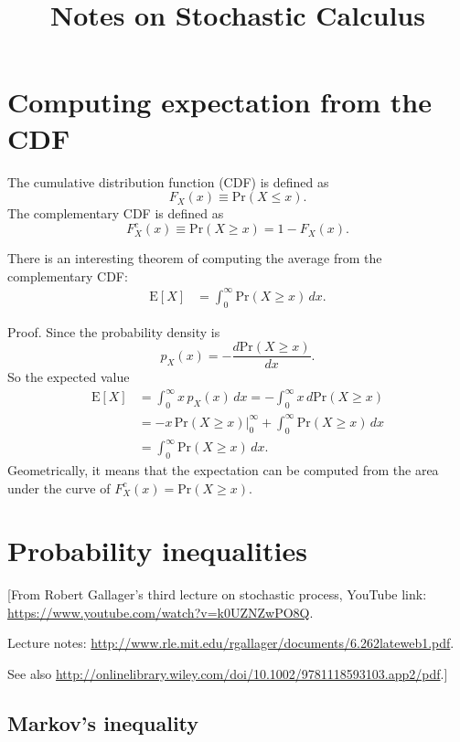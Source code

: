 \documentclass{article}
\begin{document}
\title{Notes on Stochastic Calculus}
\author{ \vspace{-10ex} }
\date{ \vspace{-10ex} }
\maketitle

\section{Computing expectation from the CDF}

The cumulative distribution function (CDF) is defined as
$$
F_X(x) \equiv \mathrm{Pr}(X \le x).
$$
The complementary CDF is defined as
$$
F^c_X(x) \equiv \mathrm{Pr}(X \ge x) = 1 - F_X(x).
$$

There is an interesting theorem of computing the average
from the complementary CDF:
\begin{align}
\mathrm{E}[X] &= \int_0^\infty \mathrm{Pr}(X \ge x) \, dx.
\label{eq:avccdf}
\end{align}

Proof. Since the probability density is
$$
p_X(x) = - \frac{ d \mathrm{Pr}(X\ge x) }{ d x }.
$$
So the expected value
$$
\begin{aligned}
\mathrm{E}[X] &= \int_0^\infty x \, p_X(x) \, dx
 = -\int_0^\infty x \, d \mathrm{Pr}(X \ge x) \\
 &= -x \, \mathrm{Pr}(X\ge x) \Bigr|_0^\infty
  + \int_0^\infty \mathrm{Pr}(X \ge x) \, dx \\
 &= \int_0^\infty \mathrm{Pr}(X \ge x) \, dx.
\end{aligned}
$$
Geometrically, it means that the expectation can be computed from
the area under the curve of $F^c_X(x) = \mathrm{Pr}(X \ge x)$.


\section{Probability inequalities}

[From Robert Gallager's third lecture on stochastic process,
YouTube link: \url{https://www.youtube.com/watch?v=k0UZNZwPO8Q}.

Lecture notes: \url{http://www.rle.mit.edu/rgallager/documents/6.262lateweb1.pdf}.

See also \url{http://onlinelibrary.wiley.com/doi/10.1002/9781118593103.app2/pdf}.]



\subsection{Markov's inequality}
\end{document}
